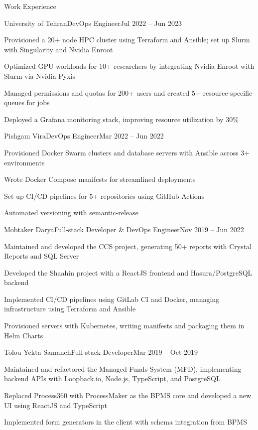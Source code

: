 \documentclass[]{main}
\begin{document}
\begin{section}{Work Experience}
\begin{subsection}{University of Tehran}{DevOps Engineer}{Jul 2022 -- Jun 2023}{}
     \item Provisioned a 20+ node HPC cluster using Terraform and Ansible; set up Slurm with Singularity and Nvidia Enroot
     \item Optimized GPU workloads for 10+ researchers by integrating Nvidia Enroot with Slurm via Nvidia Pyxis
     \item Managed permissions and quotas for 200+ users and created 5+ resource-specific queues for jobs
     \item Deployed a Grafana monitoring stack, improving resource utilization by 30\%
 \end{subsection}
 \begin{subsection}{Pishgam Vira}{DevOps Engineer}{Mar 2022 -- Jun 2022}{}
     \item Provisioned Docker Swarm clusters and database servers with Ansible across 3+ environments
     \item Wrote Docker Compose manifests for streamlined deployments
     \item Set up CI/CD pipelines for 5+ repositories using GitHub Actions
     \item Automated versioning with semantic-release
 \end{subsection}
 \begin{subsection}{Mobtaker Darya}{Full-stack Developer \& DevOps Engineer}{Nov 2019 -- Jun 2022}{}
     \item Maintained and developed the CCS project, generating 50+ reports with Crystal Reports and SQL Server
     \item Developed the Shaahin project with a ReactJS frontend and Hasura/PostgreSQL backend
     \item Implemented CI/CD pipelines using GitLab CI and Docker, managing infrastructure using Terraform and Ansible
     \item Provisioned servers with Kubernetes, writing manifests and packaging them in Helm Charts
 \end{subsection}
 \begin{subsection}{Tolou Yekta Samaneh}{Full-stack Developer}{Mar 2019 -- Oct 2019}{}
     \item Maintained and refactored the Managed-Funds System (MFD), implementing backend APIs with Loopback.io, Node.js, TypeScript, and PostgreSQL
     \item Replaced Process360 with ProcessMaker as the BPMS core and developed a new UI using ReactJS and TypeScript
     \item Implemented form generators in the client with schema integration from BPMS

\end{subsection}
\end{section}
\end{document}
